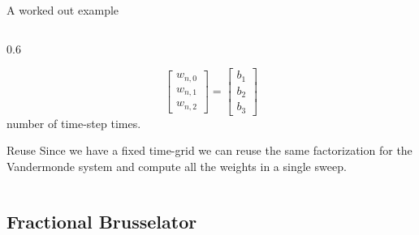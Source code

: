 \documentclass[aspectratio=169,xcolor=dvipsnames]{beamer}
\begin{document}
\begin{frame}[fragile]{A worked out example}
\begin{columns}
\begin{column}{0.6\columnwidth}
\begin{itemize}
{\[\begin{bmatrix}
	w_{n,0} \\ w_{n,1} \\ w_{n,2} 
	\end{bmatrix} = \begin{bmatrix}
	b_1 \\ b_2 \\ b_3
	\end{bmatrix}
	\]
	number of time-step times.\vspace{-0.5em}
	\begin{block}{\small Reuse}\small
	Since we have a fixed time-grid we can reuse the same factorization for the Vandermonde system and
	compute all the weights in a single sweep.
	\end{block}
	}
\end{itemize}
\end{column}
\end{columns}
\end{frame}

\subsection{Fractional Brusselator}
\end{document}
